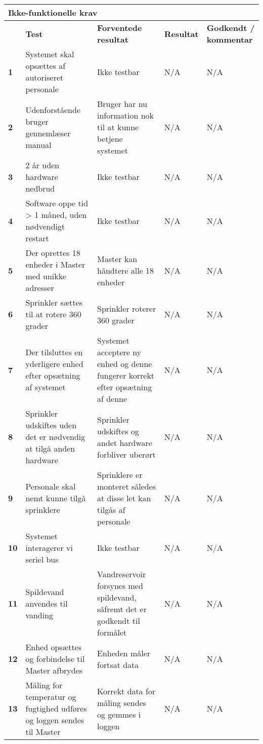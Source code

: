 
\begin{longtable}{|p{5mm}|p{40mm}|p{40mm}|p{20mm}|p{25mm}|}
\hline 
\multicolumn{5}{|l|}{\textbf{Ikke-funktionelle krav}} \\ 
\hline 
& \textbf{Test} & \textbf{Forventede resultat} & \textbf{Resultat} & \textbf{Godkendt / kommentar} \\ 
\hline 
\textbf{1}&Systemet skal opsættes af autoriseret personale & Ikke testbar & N/A & N/A \\ 
\hline 
\textbf{2}&Udenforstående bruger gennemlæser manual & Bruger har nu information nok til at kunne betjene systemet & N/A & N/A \\ 
\hline 
\textbf{3}& 2 år uden hardware nedbrud & Ikke testbar & N/A & N/A \\ 
\hline 
\textbf{4}& Software oppe tid > 1 måned, uden nødvendigt restart & Ikke testbar & N/A & N/A \\ 
\hline 
\textbf{5}& Der oprettes 18 enheder i Master med unikke adresser & Master kan håndtere alle 18 enheder & N/A & N/A \\ 
\hline 
\textbf{6}& Sprinkler sættes til at rotere 360 grader & Sprinkler roterer 360 grader & N/A & N/A \\ 
\hline 
\textbf{7}& Der tilsluttes en yderligere enhed efter opsætning af systemet & Systemet acceptere ny enhed og denne fungerer korrekt efter opsætning af denne & N/A & N/A \\ 
\hline 
\textbf{8}& Sprinkler udskiftes uden det er nødvendig at tilgå anden hardware & Sprinkler udskiftes og andet hardware forbliver uberørt & N/A & N/A \\ 
\hline 
\textbf{9}& Personale skal nemt kunne tilgå sprinklere & Sprinklere er monteret således at disse let kan tilgås af personale & N/A & N/A \\ 
\hline 
\textbf{10}& Systemet interagerer vi seriel bus & Ikke testbar & N/A & N/A \\ 
\hline 
\textbf{11}& Spildevand anvendes til vanding & Vandreservoir forsynes med spildevand, såfremt det er godkendt til formålet & N/A & N/A \\ 
\hline 
\textbf{12}& Enhed opsættes og forbindelse til Master afbrydes & Enheden måler fortsat data & N/A & N/A \\ 
\hline 
\textbf{13}& Måling for temperatur og fugtighed udføres og loggen sendes til Master & Korrekt data for måling sendes og gemmes i loggen & N/A & N/A \\ 
\hline 

\end{longtable}
